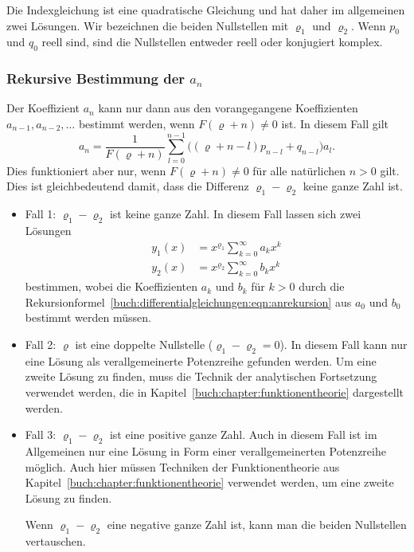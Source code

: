 Die Indexgleichung ist eine quadratische Gleichung und hat daher
im allgemeinen zwei Lösungen.
Wir bezeichnen die beiden Nullstellen mit $\varrho_1$ und $\varrho_2$.
Wenn $p_0$ und $q_0$ reell sind, sind die Nullstellen entweder reell
oder konjugiert komplex.

%
%
\subsubsection{Rekursive Bestimmung der $a_n$}
Der Koeffizient $a_{n}$ kann nur dann aus den vorangegangene
Koeffizienten $a_{n-1},a_{n-2},\dots$ bestimmt werden, wenn
$F(\varrho+n)\ne 0$ ist.
In diesem Fall gilt
\begin{equation}
a_n
=
\frac{1}{F(\varrho+n)}
\sum_{l=0}^{n-1}\bigl( (\varrho+n-l)p_{n-l} + q_{n-l}\bigr)a_l.
\label{buch:differentialgleichungen:eqn:anrekursion}
\end{equation}
Dies funktioniert aber nur, wenn $F(\varrho+n)\ne 0$ für alle
natürlichen $n > 0$ gilt.
Dies ist gleichbedeutend damit, dass die Differenz $\varrho_1-\varrho_2$
keine ganze Zahl ist.

\begin{itemize}
\item
Fall 1: $\varrho_1-\varrho_2$ ist keine ganze Zahl.
In diesem Fall lassen sich zwei Lösungen
\begin{align*}
y_1(x) &= x^{\varrho_1}\sum_{k=0}^\infty a_k x^k
\\
y_2(x) &= x^{\varrho_2}\sum_{k=0}^\infty b_k x^k
\end{align*}
bestimmen, wobei die Koeffizienten $a_k$ und $b_k$ für $k>0$ durch
die Rekursionformel~\eqref{buch:differentialgleichungen:eqn:anrekursion}
aus $a_0$ und $b_0$ bestimmt werden müssen.

\item
Fall 2: $\varrho$ ist eine doppelte Nullstelle ($\varrho_1-\varrho_2=0$).
In diesem Fall kann nur eine Lösung als verallgemeinerte Potenzreihe
gefunden werden.
Um eine zweite Lösung zu finden, muss die Technik der analytischen
Fortsetzung verwendet werden, die in
Kapitel~\ref{buch:chapter:funktionentheorie}
dargestellt werden.

\item
Fall 3: $\varrho_1-\varrho_2$ ist eine positive ganze Zahl.
Auch in diesem Fall ist im Allgemeinen nur eine Lösung in Form einer
verallgemeinerten Potenzreihe möglich.
Auch hier müssen Techniken der Funktionentheorie aus
Kapitel~\ref{buch:chapter:funktionentheorie}
verwendet werden, um eine zweite Lösung zu finden.

Wenn $\varrho_1-\varrho_2$ eine negative ganze Zahl ist, kann man die
beiden Nullstellen vertauschen.
\end{itemize}






